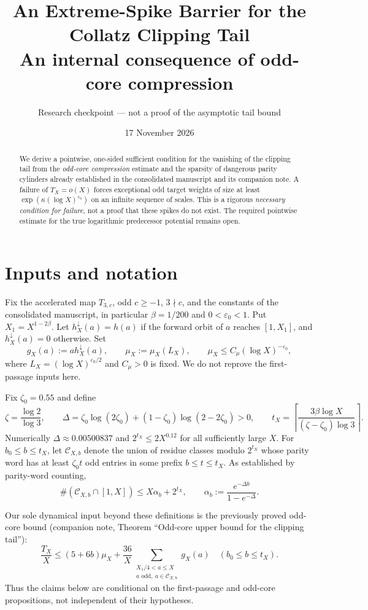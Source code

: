 \documentclass[11pt,a4paper]{article}
\title{An Extreme-Spike Barrier for the Collatz Clipping Tail\\
\large An internal consequence of odd-core compression}
\author{Research checkpoint --- not a proof of the asymptotic tail bound}
\date{17 November 2026}
\begin{document}
\maketitle
\begin{abstract}
We derive a pointwise, one-sided sufficient condition for the vanishing
of the clipping tail from the \emph{odd-core compression} estimate and the
sparsity of dangerous parity cylinders already established in the
consolidated manuscript and its companion note. A failure of
$T_X=o(X)$ forces exceptional odd target weights of size at least
$\exp(\kappa (\log X)^{\varepsilon_0})$ on an infinite sequence of scales.
This is a rigorous \emph{necessary condition for failure}, not a proof
that these spikes do not exist. The required pointwise estimate for the
true logarithmic predecessor potential remains open.
\end{abstract}

\section{Inputs and notation}
Fix the accelerated map $T_{3,c}$, odd $c\ge-1$, $3\nmid c$, and the
constants of the consolidated manuscript, in particular $\beta=1/200$
and $0<\varepsilon_0<1$. Put $X_1=X^{1-2\beta}$.
Let $h_X^\downarrow(a)=h(a)$ if the forward orbit of $a$ reaches
$[1,X_1]$, and $h_X^\downarrow(a)=0$ otherwise.  Set
\[
 g_X(a):=a h_X^\downarrow(a),\qquad
 \mu_X:=\mu_X(L_X),\qquad
 \mu_X\le C_\mu(\log X)^{-\varepsilon_0},
\]
where $L_X=(\log X)^{\varepsilon_0/2}$ and $C_\mu>0$ is fixed.
We do not reprove the first-passage inputs here.

Fix $\zeta_0=0.55$ and define
\[
 \zeta=\frac{\log2}{\log3},\qquad
 \Delta=\zeta_0\log(2\zeta_0)+(1-\zeta_0)\log(2-2\zeta_0)>0,
 \qquad t_X=\left\lceil\frac{3\beta\log X}{(\zeta-\zeta_0)\log3}\right\rceil.
\]
Numerically $\Delta\approx0.00500837$ and
$2^{t_X}\le 2X^{0.12}$ for all sufficiently large $X$.
For $b_0\le b\le t_X$, let $\mathcal C_{X,b}$ denote the union
of residue classes modulo $2^{t_X}$ whose parity word has at least
$\zeta_0 t$ odd entries in some prefix $b\le t\le t_X$.
As established by parity-word counting,
\begin{equation}\label{eq:sparse}
 \#(\mathcal C_{X,b}\cap[1,X])\le X\alpha_b+2^{t_X},
 \qquad \alpha_b:=\frac{e^{-\Delta b}}{1-e^{-\Delta}}.
\end{equation}

Our sole dynamical input beyond these definitions is the previously
proved odd-core bound (companion note, Theorem ``Odd-core upper bound
for the clipping tail''):
\begin{equation}\label{eq:oddinput}
 \frac{T_X}{X}\le (5+6b)\mu_X+
 \frac{36}{X}\sum_{\substack{X_1/4<a\le X\\a\text{ odd},\ a\in\mathcal C_{X,b}}}g_X(a)
 \quad(b_0\le b\le t_X).
\end{equation}
Thus the claims below are conditional on the first-passage and odd-core
propositions, not independent of their hypotheses.
\end{document}
